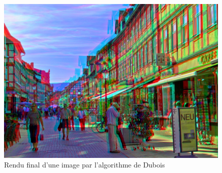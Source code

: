 \begin{figure}[h]
		\centering
		\includegraphics[scale=1]{algoDubois.png}
		\caption{\label{fig:algoDubois} Rendu final d’une image par l’algorithme de Dubois \protect \footnotemark }
\end{figure}
	
	
